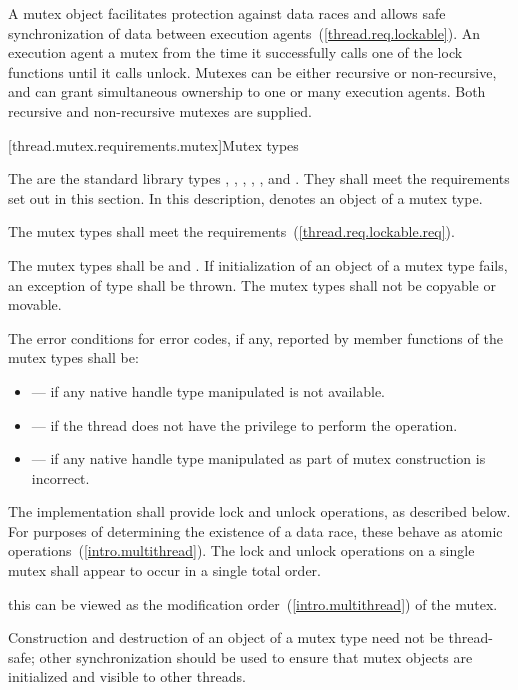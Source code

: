 \pnum
A mutex object facilitates protection against data races and allows safe synchronization of
data between execution agents~(\ref{thread.req.lockable}).
An execution agent  a mutex from the time it successfully calls one of the
lock functions until it calls unlock. Mutexes can be either recursive or non-recursive, and can
grant simultaneous ownership to one or many execution agents. Both
recursive and non-recursive mutexes are supplied.

[thread.mutex.requirements.mutex]{Mutex types}

\pnum
The  are the standard library types ,
, , ,
, and .
They shall meet the requirements set out in this section. In this description, 
denotes an object of a mutex type.

\pnum
The mutex types shall meet the  requirements~(\ref{thread.req.lockable.req}).

\pnum
The mutex types shall be  and . If
initialization of an object of a mutex type fails, an exception of type
 shall be thrown. The mutex types shall not be copyable or movable.

\pnum
The error conditions for error codes, if any, reported by member functions of the mutex types
shall be:
\begin{itemize}
\item {} --- if any native handle type manipulated is not available.
\item {} --- if the thread does not have the
privilege to perform the operation.
\item {} --- if any native handle type manipulated as part of mutex
construction is incorrect.
\end{itemize}

\pnum
The implementation shall provide lock and unlock operations, as described below.
For purposes of determining the existence of a data race, these behave as
atomic operations~(\ref{intro.multithread}). The lock and unlock operations on
a single mutex shall appear to occur in a single total order. \begin{note} this
can be viewed as the modification order~(\ref{intro.multithread}) of the
mutex. \end{note}
\begin{note} Construction and
destruction of an object of a mutex type need not be thread-safe; other
synchronization should be used to ensure that mutex objects are initialized
and visible to other threads. \end{note}

